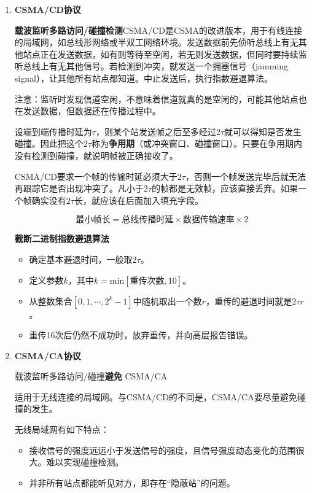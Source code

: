 \documentclass[12pt, a4paper, oneside]{ctexart}
\begin{document}
\begin{enumerate}
    \item {\bf CSMA/CD协议}
    
    \textbf{载波监听多路访问/碰撞检测}CSMA/CD是CSMA的改进版本，用于有线连接的局域网，如总线形网络或半双工网络环境。发送数据前先侦听总线上有无其他站点正在发送数据，如有则等待至空闲，若无则发送数据，但同时要持续监听总线上有无其他信号。若检测到冲突，就发送一个拥塞信号（jamming signal），让其他所有站点都知道。中止发送后，执行指数避退算法。

    注意：监听时发现信道空闲，不意味着信道就真的是空闲的，可能其他站点也在发送数据，但数据还在传播过程中。

    设端到端传播时延为$\tau$，则某个站发送帧之后至多经过$2\tau$就可以得知是否发生碰撞。因此把这个$2\tau$称为\textbf{争用期}（或冲突窗口、碰撞窗口）。只要在争用期内没有检测到碰撞，就说明帧被正确接收了。

    CSMA/CD要求一个帧的传输时延必须大于$2\tau$，否则一个帧发送完毕后就无法再跟踪它是否出现冲突了。凡小于$2\tau$的帧都是无效帧，应该直接丢弃。如果一个帧确实没有$2\tau$长，就应该在后面加入填充字段。

    \begin{equation*}
        \text{最小帧长}=\text{总线传播时延}\times\text{数据传输速率}\times 2
    \end{equation*}

    \textbf{截断二进制指数避退算法}
    \begin{itemize}
        \item 确定基本避退时间，一般取$2\tau$。
        \item 定义参数$k$，其中$k=\text{min}[\text{重传次数}, 10]$。
        \item 从整数集合$[0,1,\cdots,2^k-1]$中随机取出一个数$r$，重传的避退时间就是$2\tau r$。
        \item 重传16次后仍然不成功时，放弃重传，并向高层报告错误。
    \end{itemize}
    \item {\bf CSMA/CA协议}

    载波监听多路访问/碰撞\textbf{避免} CSMA/CA
    
    适用于无线连接的局域网。与CSMA/CD的不同是，CSMA/CA要尽量避免碰撞的发生。

    无线局域网有如下特点：
    \begin{itemize}
        \item 接收信号的强度远远小于发送信号的强度，且信号强度动态变化的范围很大。难以实现碰撞检测。
        \item 并非所有站点都能听见对方，即存在“隐蔽站”的问题。
    \end{itemize}


\end{enumerate}
\end{document}
